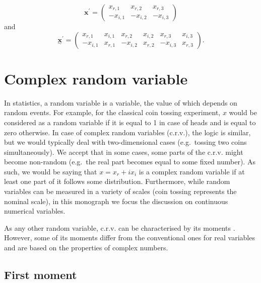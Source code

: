 \documentclass[
]{book}
\begin{document}
\begin{equation}
    {\mathbf{x}}^{\prime} = \begin{pmatrix} x_{r,1} & x_{r,2} & x_{r,3} \\
                                         -x_{i,1} & -x_{i,2} & -x_{i,3}
                        \end{pmatrix} 
    \label{eq:complexVectorMatrixTransposedConj}
\end{equation}
and
\begin{equation}
    \underset{\sim}{\mathbf{x}}^{\prime} = \begin{pmatrix} x_{r,1} & x_{i,1} & x_{r,2} & x_{i,2} & x_{r,3} & x_{i,3} \\
                                        -x_{i,1} & x_{r,1} & -x_{i,2} & x_{r,2} & -x_{i,3} & x_{r,3}
                        \end{pmatrix} .
    \label{eq:complexMatrixTransposedConj}
\end{equation}

\hypertarget{complexRandomVariable}{%
\section{Complex random variable}\label{complexRandomVariable}}

In statistics, a random variable is a variable, the value of which depends on random events. For example, for the classical coin tossing experiment, \(x\) would be considered as a random variable if it is equal to 1 in case of heads and is equal to zero otherwise. In case of complex random variables (c.r.v.), the logic is similar, but we would typically deal with two-dimensional cases (e.g.~tossing two coins simultaneously). We accept that in some cases, some parts of the c.r.v. might become non-random (e.g.~the real part becomes equal to some fixed number). As such, we would be saying that \(x=x_r+ix_i\) is a complex random variable if at least one part of it follows some distribution. Furthermore, while random variables can be measured in a variety of scales (coin tossing represents the nominal scale), in this monograph we focus the discussion on continuous numerical variables.

As any other random variable, c.r.v. can be characterised by its moments \citep[see, for example,][]{Reed1962}. However, some of its moments differ from the conventional ones for real variables and are based on the properties of complex numbers.

\hypertarget{first-moment}{%
\subsection{First moment}\label{first-moment}}
\end{document}
